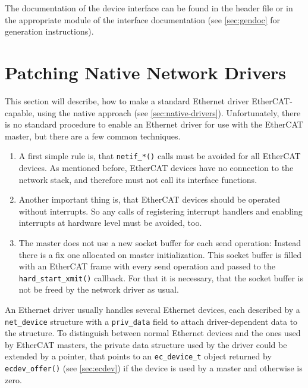 \documentclass[a4paper,12pt,BCOR=6mm,bibtotoc,idxtotoc]{scrbook}
\begin{document}
The documentation of the device interface can be found in the header file or
in the appropriate module of the interface documentation (see
\autoref{sec:gendoc} for generation instructions).



\section{Patching Native Network Drivers}
\label{sec:patching}

This section will describe, how to make a standard Ethernet driver
EtherCAT-capable, using the native approach (see
\autoref{sec:native-drivers}). Unfortunately, there is no standard procedure
to enable an Ethernet driver for use with the EtherCAT master, but there are a
few common techniques.

\begin{enumerate}

\item A first simple rule is, that \lstinline+netif_*()+ calls must be avoided
for all EtherCAT devices. As mentioned before, EtherCAT devices have no
connection to the network stack, and therefore must not call its interface
functions.

\item Another important thing is, that EtherCAT devices should be operated
without interrupts. So any calls of registering interrupt handlers and enabling
interrupts at hardware level must be avoided, too.

\item The master does not use a new socket buffer for each send operation:
Instead there is a fix one allocated on master initialization. This socket
buffer is filled with an EtherCAT frame with every send operation and passed to
the \lstinline+hard_start_xmit()+ callback. For that it is necessary, that the
socket buffer is not be freed by the network driver as usual.

\end{enumerate}

An Ethernet driver usually handles several Ethernet devices, each described by
a \lstinline+net_device+ structure with a \lstinline+priv_data+ field to
attach driver-dependent data to the structure. To distinguish between normal
Ethernet devices and the ones used by EtherCAT masters, the private data
structure used by the driver could be extended by a pointer, that points to an
\lstinline+ec_device_t+ object returned by \lstinline+ecdev_offer()+ (see
\autoref{sec:ecdev}) if the device is used by a master and otherwise is zero.
\end{document}
